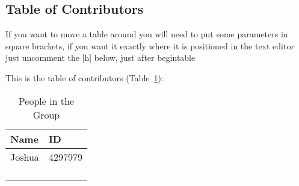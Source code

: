 \subsection{Table of Contributors}


If you want to move a table around you will need to put some parameters in square brackets, if you want it exactly where it is positioned in the text editor just uncomment the [h] below, just after begin{table}

This is the table of contributors (Table~\ref{authors}):
\begin{table}[h]
\centering
\caption{People in the Group}
\label{authors}
\begin{tabular}{|l|l|}
\hline
\textbf{Name} & \textbf{ID} \\
\hline Joshua 
& 4297979\\ 
\hline
& \\
\hline
& \\
\hline
& \\
\hline
& \\
\hline
\end{tabular}
\end{table}